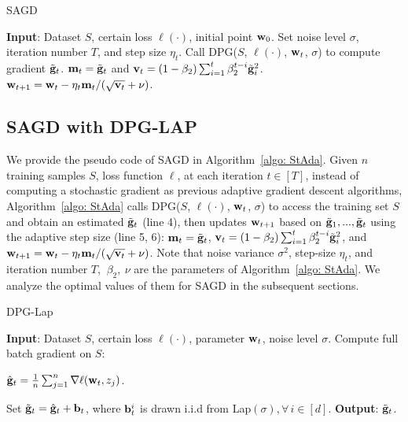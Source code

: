 \documentclass[11pt]{article}
\begin{document}
\begin{algorithm}[H] 
\caption{\textsc{SAGD}}
\begin{algorithmic}[1] \label{algo: StAda}
\STATE \textbf{Input}: Dataset $S$,  certain loss $\ell(\cdot)$, initial point $\mathbf{w}_0$.
\STATE Set  noise level $\sigma$, iteration number $T$,  and step size $\eta_t$.
\STATE  Call DPG($S$,  $\ell(\cdot)$, $\mathbf{w}_t$, $\sigma$) to compute gradient $\tilde {\mathbf{g}}_t$.
\STATE 
$\mathbf{m}_t = \tilde {\mathbf{g}}_t$ and $\mathbf{v}_t = \left(1-\beta_{2}\right) \sum_{i=1}^{t} \beta_{2}^{t-i} \tilde {\mathbf{g}}_{i}^{2}$.
\STATE $\mathbf{w}_{t+1}=\mathbf{w}_{t}-\eta_t \mathbf{m}_t /(\sqrt{\mathbf{v}_t}+\nu)$.
\ENDFOR 
\end{algorithmic}
\end{algorithm}

\subsection{\textsc{SAGD} with DPG-LAP} \label{subsec: SAGD_lap}
We provide the pseudo code of \textsc{SAGD} in Algorithm~\ref{algo: StAda}. Given $n$ training samples $S$, loss function $\ell$, at each iteration $t \in [T]$, instead of computing a stochastic gradient as previous adaptive gradient descent algorithms, 
Algorithm~\ref{algo: StAda} calls DPG($S$,  $\ell(\cdot)$, $\mathbf{w}_t$, $\sigma$) to access the training set $S$ and obtain an estimated $\tilde {\mathbf{g}}_t$ (line 4), then updates $\mathbf{w}_{t+1}$ based on $\tilde {\mathbf{g}}_1,..., \tilde {\mathbf{g}}_t$ using the adaptive step size (line 5, 6):
$\mathbf{m}_t = \tilde {\mathbf{g}}_t$, $\mathbf{v}_t = \left(1-\beta_{2}\right) \sum_{i=1}^{t} \beta_{2}^{t-i} \tilde {\mathbf{g}}_{i}^{2}$, and
 $\mathbf{w}_{t+1}=\mathbf{w}_{t}-\eta_t \mathbf{m}_t /(\sqrt{\mathbf{v}_t}+\nu)$.
Note that noise variance $\sigma^2$, step-size $\eta_t$, and iteration number $T$, $~ \beta_2,~\nu$ are the parameters of Algorithm~\ref{algo: StAda}. We analyze the optimal values of them for \textsc{SAGD} in the subsequent sections. 


\begin{algorithm}[h!]
\caption{DPG-Lap}
\begin{algorithmic}[1]
\label{algo: lap}
	\STATE \textbf{Input}: Dataset $S$,  certain loss $\ell(\cdot)$, parameter $\mathbf{w}_t$, noise level $\sigma$.
	\STATE Compute full batch gradient on $S$: \\
	\centerline{ $\hat {\mathbf{g}}_t = \frac{1}{n} \sum_{j=1}^n\nabla \ell(\mathbf{w}_t, z_j)$.}	
	\STATE Set $\tilde {\mathbf{g}}_t = \hat {\mathbf{g}}_t + \mathbf{b}_t$, where $\mathbf{b}_t^i$ is drawn i.i.d from Lap$(\sigma), \forall\, i \in [d]$.
	\STATE \textbf{Output}: $\tilde {\mathbf{g}}_t$.
	\end{algorithmic}
\end{algorithm}
\end{document}
